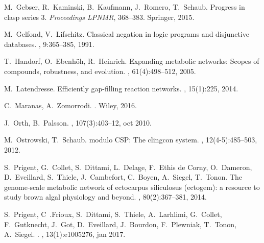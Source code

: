 \begin{thebibliography}{10}
M.~Gebser, R.~Kaminski, B.~Kaufmann, J.~Romero, T.~Schaub.
\newblock Progress in clasp series 3.
\newblock 
{\em Proceedings LPNMR},
368--383. Springer, 2015.

M.~Gelfond, V.~Lifschitz.
\newblock Classical negation in logic programs and disjunctive databases.
, 9:365--385, 1991.

T.~Handorf, O.~Ebenhöh, R.~Heinrich.
\newblock Expanding metabolic networks: Scopes of compounds, robustness, and evolution.
, 61(4):498--512, 2005.

M.~Latendresse.
\newblock Efficiently gap-filling reaction networks.
, 15(1):225, 2014.

C.~Maranas, A.~Zomorrodi.
.
\newblock Wiley, 2016.

J.~Orth, B.~Palsson.
, 107(3):403--12, oct 2010.


M.~Ostrowski, T.~Schaub.
 modulo {CSP}: The clingcon system.
, 12(4-5):485--503, 2012.


S.~Prigent, G.~Collet, S.~Dittami, L.~Delage, F.~{Ethis de Corny}, O.~Dameron, D.~Eveillard, S.~Thiele, J.~Cambefort, C.~Boyen, A.~Siegel, T.~Tonon.
\newblock The genome-scale metabolic network of ectocarpus siliculosus (ectogem): a resource to study brown algal physiology and beyond.
, 80(2):367–381, 2014.

S.~Prigent, C~.Frioux, S.~Dittami, S.~Thiele, A.~Larhlimi, G.~Collet, F.~Gutknecht, J.~Got, D.~Eveillard, J.~Bourdon, F.~Plewniak, T.~Tonon, A.~Siegel.
.
, 13(1):e1005276, jan 2017.


\end{thebibliography}
